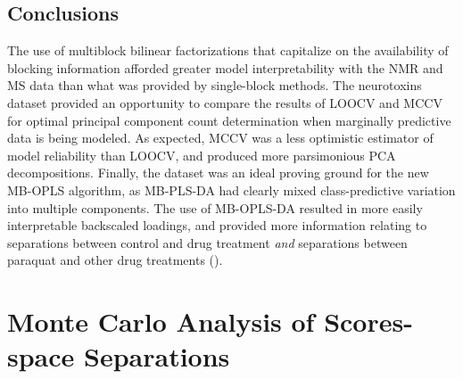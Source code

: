 \subsection{Conclusions}

\begin{doublespace}
The use of multiblock bilinear factorizations that capitalize on the
availability of blocking information afforded greater model interpretability
with the NMR and MS data than what was provided by single-block methods. The
neurotoxins dataset provided an opportunity to compare the results of LOOCV
and MCCV for optimal principal component count determination when marginally
predictive data is being modeled. As expected, MCCV was a less optimistic
estimator of model reliability than LOOCV, and produced more parsimonious PCA
decompositions. Finally, the dataset was an ideal proving ground for the new
MB-OPLS algorithm, as MB-PLS-DA had clearly mixed class-predictive variation
into multiple components. The use of MB-OPLS-DA resulted in more easily
interpretable backscaled loadings, and provided more information relating to
separations between control and drug treatment \emph{and} separations between
paraquat and other drug treatments ().
\end{doublespace}

\section{Monte Carlo Analysis of Scores-space Separations}

